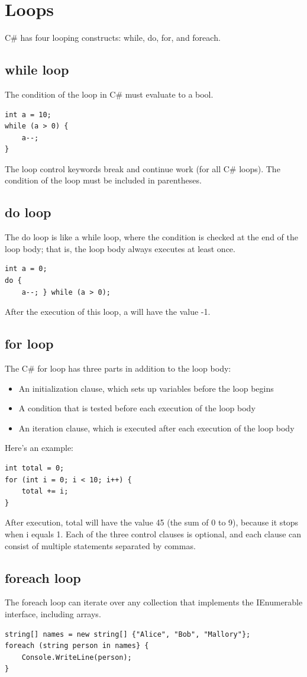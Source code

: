 \documentclass[12pt,a4paper,final,twoside,titlepage]{book}
\begin{document}
\section{Loops}
C\# has four looping constructs: while, do, for, and foreach.
\subsection{while loop}
The condition of the loop in C\# must evaluate to a bool.
\begin{lstlisting}
int a = 10; 
while (a > 0) {
	a--;
}
\end{lstlisting}
The loop control keywords break and continue work (for all C\# loops). The condition of the loop must be included in parentheses.
\subsection{do loop}
The do loop is like a while loop, where the condition is checked at the end of the loop body; that is, the loop body always executes at least once.
\begin{lstlisting}
int a = 0; 
do {
	a--; } while (a > 0);
\end{lstlisting}
After the execution of this loop, a will have the value -1.
\subsection{for loop}
The C\# for loop has three parts in addition to the loop body:
\begin{itemize}
\item An initialization clause, which sets up variables before the loop begins 
\item A condition that is tested before each execution of the loop body 
\item An iteration clause, which is executed after each execution of the loop body
\end{itemize}
Here’s an example:
\begin{lstlisting}
int total = 0; 
for (int i = 0; i < 10; i++) {
	total += i;
}
\end{lstlisting}
After execution, total will have the value 45 (the sum of 0 to 9), because it stops when i equals 1. Each of the three control clauses is optional, and each clause can consist of multiple statements separated by commas.
\subsection{foreach loop}
The foreach loop can iterate over any collection that implements the IEnumerable interface, including arrays.
\begin{lstlisting}
string[] names = new string[] {"Alice", "Bob", "Mallory"}; 
foreach (string person in names} {
	Console.WriteLine(person);
}
\end{lstlisting}
\end{document}
